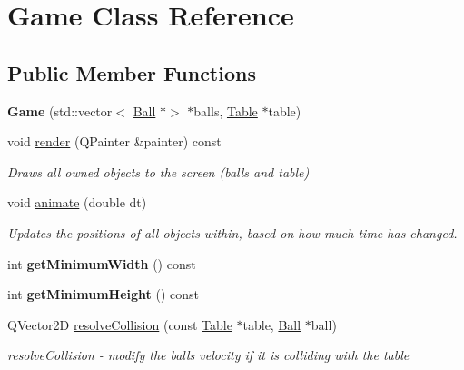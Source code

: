 \hypertarget{class_game}{}\section{Game Class Reference}
\label{class_game}
\subsection*{Public Member Functions}
\begin{DoxyCompactItemize}
\item 
\mbox{\label{class_game_a1d3aba143e23c5b7bafda7852c2ce3b9}} 
{\bfseries Game} (std\+::vector$<$ \mbox{\hyperlink{class_ball}{Ball}} $\ast$$>$ $\ast$balls, \mbox{\hyperlink{class_table}{Table}} $\ast$table)
\item 
void \mbox{\hyperlink{class_game_af80284dbc78f4829aeb0f2420373f605}{render}} (Q\+Painter \&painter) const
\begin{DoxyCompactList}\small\item\em Draws all owned objects to the screen (balls and table) \end{DoxyCompactList}\item 
void \mbox{\hyperlink{class_game_a40c08e2135ae529a820cdeeff32c5144}{animate}} (double dt)
\begin{DoxyCompactList}\small\item\em Updates the positions of all objects within, based on how much time has changed. \end{DoxyCompactList}\item 
\mbox{\label{class_game_a0eee5d6dca8985da6e57bd548214a507}} 
int {\bfseries get\+Minimum\+Width} () const
\item 
\mbox{\label{class_game_a0712183d4b571d7e3aeb60745b597abd}} 
int {\bfseries get\+Minimum\+Height} () const
\item 
Q\+Vector2D \mbox{\hyperlink{class_game_a8063ed6374c6bbadad0cbe71364fe764}{resolve\+Collision}} (const \mbox{\hyperlink{class_table}{Table}} $\ast$table, \mbox{\hyperlink{class_ball}{Ball}} $\ast$ball)
\begin{DoxyCompactList}\small\item\em resolve\+Collision -\/ modify the ball\textquotesingle{}s velocity if it is colliding with the table \end{DoxyCompactList}\item 
$$
\end{DoxyCompactItemize}
